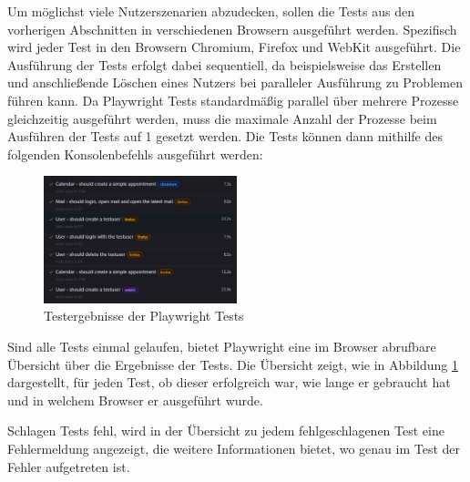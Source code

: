 Um möglichst viele Nutzerszenarien abzudecken, sollen die Tests aus den vorherigen Abschnitten in verschiedenen Browsern ausgeführt werden.
Spezifisch wird jeder Test in den Browsern Chromium, Firefox und WebKit ausgeführt.
Die Ausführung der Tests erfolgt dabei sequentiell, da beispielsweise das Erstellen und anschließende Löschen eines Nutzers bei paralleler Ausführung zu Problemen führen kann.
Da Playwright Tests standardmäßig parallel über mehrere Prozesse gleichzeitig ausgeführt werden, muss die maximale Anzahl der Prozesse beim Ausführen der Tests auf 1 gesetzt werden. Die Tests können dann mithilfe des folgenden Konsolenbefehls ausgeführt werden:


\begin{figure}[H]
    \centering
    \includegraphics[width=0.5\textwidth]{images/PlaywrightResults.png}
    \caption{Testergebnisse der Playwright Tests}
    \label{fig:playwright-results}
\end{figure}

Sind alle Tests einmal gelaufen, bietet Playwright eine im Browser abrufbare Übersicht über die Ergebnisse der Tests.
Die Übersicht zeigt, wie in Abbildung \ref{fig:playwright-results} dargestellt, für jeden Test, ob dieser erfolgreich war, wie lange er gebraucht hat und in welchem Browser er ausgeführt wurde.

Schlagen Tests fehl, wird in der Übersicht zu jedem fehlgeschlagenen Test eine Fehlermeldung angezeigt, die weitere Informationen bietet, wo genau im Test der Fehler aufgetreten ist.